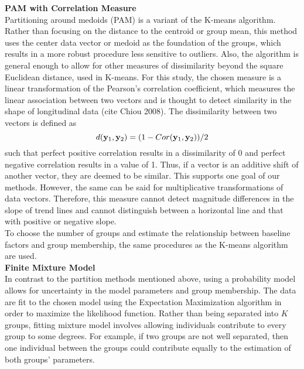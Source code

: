 \textbf{PAM with Correlation Measure}\\
Partitioning around medoids (PAM) is a variant of the K-means algorithm. Rather than focusing on the distance to the centroid or group mean, this method uses the center data vector or medoid as the foundation of the groups, which results in a more robust procedure less sensitive to outliers. Also, the algorithm is general enough to allow for other measures of dissimilarity beyond the square Euclidean distance, used in K-means. For this study, the chosen measure is a linear transformation of the Pearson's correlation coefficient, which measures the linear association between two vectors and is thought to detect similarity in the shape of longitudinal data (cite Chiou 2008). The dissimilarity between two vectors is defined as
$$d(\mathbf y_{1},\mathbf y_{2}) = (1-Cor(\mathbf y_{1},\mathbf y_{2}))/2$$
such that perfect positive correlation results in a dissimilarity of 0 and perfect negative correlation results in a value of 1. Thus, if a vector is an additive shift of another vector, they are deemed to be similar. This supports one goal of our methods. However, the same can be said for multiplicative transformations of data vectors. Therefore, this measure cannot detect magnitude differences in the slope of trend lines and cannot distinguish between a horizontal line and that with positive or negative slope.\\

To choose the number of groups and estimate the relationship between baseline factors and group membership, the same procedures as the K-means algorithm are used.\\

\noindent \textbf{Finite Mixture Model}\\
In contrast to the partition methods mentioned above, using a probability model allows for uncertainty in the model parameters and group membership. The data are fit to the chosen model using the Expectation Maximization algorithm in order to maximize the likelihood function. Rather than being separated into $K$ groups, fitting mixture model involves allowing individuals contribute to every group to some degrees. For example, if two groups are not well separated, then one individual between the groups could contribute equally to the estimation of both groups' parameters. \\

